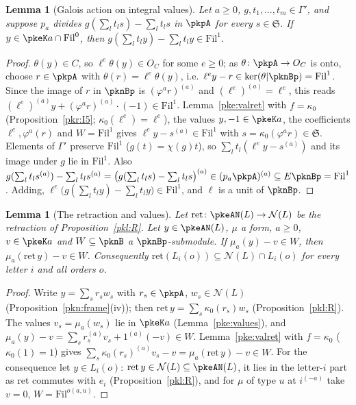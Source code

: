 \documentclass[10pt]{amsart}
\newtheorem{lemma}[theorem]{Lemma}
\theoremstyle{definition}
\theoremstyle{remark}
\begin{document}
\begin{lemma}[Galois action on integral values]\label{pke:fix}
Let $a\ge0$, $g,t_1,\dots,t_m\in\Gamma'$, and suppose $p_a$ divides $g(\sum_lt_ls)-\sum_lt_ls$ in $\pkpA$
for every $s\in\mathfrak S$. If $y\in\pkeK a\cap\mathrm{Fil}^0$, then $g(\sum_lt_ly)-\sum_lt_ly\in
\mathrm{Fil}^1$.
\end{lemma}

\begin{proof}
$\theta(y)\in C$, so $\ell^e\theta(y)\in O_C$ for some $e\ge0$; as $\theta\colon\pkpA\to O_C$ is onto,
choose $r\in\pkpA$ with $\theta(r)=\ell^e\theta(y)$, i.e.\ $\ell^ey-r\in\ker(\theta|\pknBp)=\mathrm{Fil}^1$.
Since the image of $r$ in $\pknBp$ is $(\varphi^ar)^{(a)}$ and $(\ell^e)^{(a)}=\ell^e$, this reads
$(\ell^e)^{(a)}y+(\varphi^ar)^{(a)}\cdot(-1)\in\mathrm{Fil}^1$. Lemma~\ref{pke:valret} with $f=\kappa_0$ (Proposition~\ref{pkr:I5}; $\kappa_0(\ell^e)=
\ell^e$), the values $y,-1\in\pkeK a$, the coefficients $\ell^e,\varphi^a(r)$ and $W=\mathrm{Fil}^1$ gives
$\ell^ey-s^{(a)}\in\mathrm{Fil}^1$ with $s=\kappa_0(\varphi^ar)\in\mathfrak S$. Elements of $\Gamma'$ preserve
$\mathrm{Fil}^1$ ($g(t)=\chi(g)t$), so $\sum_lt_l(\ell^ey-s^{(a)})$ and its image under $g$ lie in
$\mathrm{Fil}^1$. Also $g(\sum_lt_ls^{(a)})-\sum_lt_ls^{(a)}=\bigl(g(\sum_lt_ls)-\sum_lt_ls\bigr)^{(a)}\in
(p_a\pkpA)^{(a)}\subseteq E\pknBp=\mathrm{Fil}^1$. Adding, $\ell^e\bigl(g(\sum_lt_ly)-\sum_lt_ly\bigr)\in
\mathrm{Fil}^1$, and $\ell$ is a unit of $\pknBp$.
\end{proof}

\begin{lemma}[The retraction and values]\label{pke:ret}
Let $\mathrm{ret}\colon\pkeAN(L)\to\mathcal N(L)$ be the retraction of Proposition~\ref{pkl:R}. Let $y\in
\pkeAN(L)$, $\mu$ a form, $a\ge0$, $v\in\pkeK a$ and $W\subseteq\pknB$ a $\pknBp$-submodule. If
$\mu_a(y)-v\in W$, then $\mu_a(\mathrm{ret}\,y)-v\in W$. Consequently $\mathrm{ret}(L_i(o))\subseteq
\mathcal N(L)\cap L_i(o)$ for every letter $i$ and all orders $o$.
\end{lemma}

\begin{proof}
Write $y=\sum_sr_sw_s$ with $r_s\in\pkpA$, $w_s\in\mathcal N(L)$ (Proposition~\ref{pkn:frame}(iv)); then
$\mathrm{ret}\,y=\sum_s\kappa_0(r_s)w_s$ (Proposition~\ref{pkl:R}). The values $v_s=\mu_a(w_s)$ lie in
$\pkeK a$ (Lemma~\ref{pke:values}), and $\mu_a(y)-v=\sum_sr_s^{(a)}v_s+1^{(a)}(-v)\in W$. Lemma~\ref{pke:valret}
with $f=\kappa_0$ ($\kappa_0(1)=1$) gives $\sum_s\kappa_0(r_s)^{(a)}v_s-v=\mu_a(\mathrm{ret}\,y)-v\in W$. For
the consequence let $y\in L_i(o)$: $\mathrm{ret}\,y\in\mathcal N(L)\subseteq\pkeAN(L)$, it lies in the
letter-$i$ part as $\mathrm{ret}$ commutes with $e_i$ (Proposition~\ref{pkl:R}), and for $\mu$ of type $u$
at $i^{(-a)}$ take $v=0$, $W=\mathrm{Fil}^{o(a,u)}$.
\end{proof}
\end{document}
